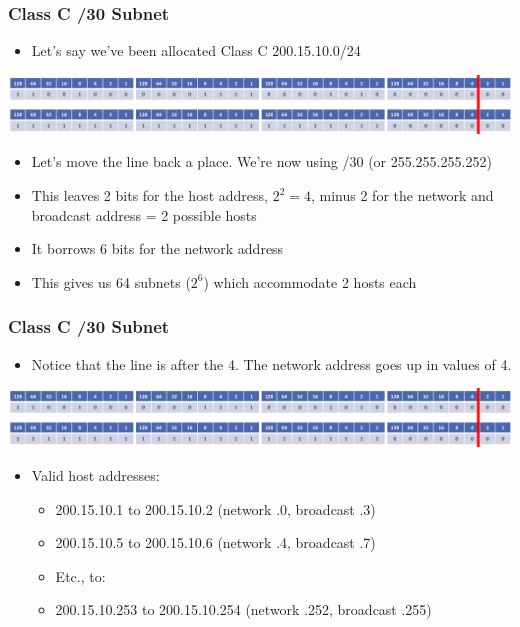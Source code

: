 \documentclass[pdflatex,compress]{beamer}
\begin{document}
\begin{frame}
	\frametitle{Class C /30 Subnet}
	\begin{itemize}
		\item Let's say we've been allocated Class C 200.15.10.0/24
	\end{itemize}
	\begin{center}
		\includegraphics[width=1\linewidth]{img/img04}
	\end{center}
	\begin{itemize}
		\item Let's move the line back a place. We're now using /30 (or 255.255.255.252)
		\item This leaves 2 bits for the host address, $ 2^2 = 4 $, minus 2 for the network and broadcast address = 2 possible hosts
		\item It borrows 6 bits for the network address
		\item This gives us 64 subnets ($ 2^6 $) which accommodate 2 hosts each
	\end{itemize}
\end{frame}

\begin{frame}
	\frametitle{Class C /30 Subnet}
	\begin{itemize}
		\item Notice that the line is after the 4. The network address goes up in values of 4.
	\end{itemize}
	\begin{center}
		\includegraphics[width=1\linewidth]{img/img04}
	\end{center}
	\begin{itemize}
		\item Valid host addresses:
		\begin{itemize}
			\item 200.15.10.1 to 200.15.10.2 (network .0, broadcast .3)
			\item 200.15.10.5 to 200.15.10.6 (network .4, broadcast .7)
			\item Etc., to:
			\item 200.15.10.253 to 200.15.10.254 (network .252, broadcast .255)
		\end{itemize}
	\end{itemize}
\end{frame}
\end{document}
